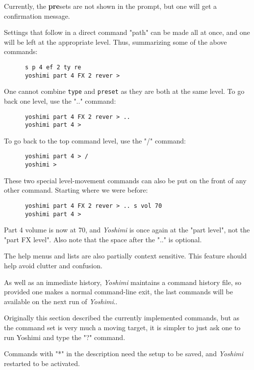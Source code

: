    Currently, the \textbf{pre}sets are not shown in the prompt, but one
   will get a confirmation message.

   Settings that follow in a direct command "path"
   can be made all at once, and one will be left at the appropriate level.
   Thus, summarizing some of the above commands:

   \begin{verbatim}
      s p 4 ef 2 ty re
      yoshimi part 4 FX 2 rever >
   \end{verbatim}

   One cannot combine \texttt{type} and \texttt{preset} as they
   are both at the same level.  To go back one level, use the
   ".." command:

   \begin{verbatim}
      yoshimi part 4 FX 2 rever > ..
      yoshimi part 4 >
   \end{verbatim}

   To go back to the top command level, use the "/" command:

   \begin{verbatim}
      yoshimi part 4 > /
      yoshimi >
   \end{verbatim}

   These two special level-movement commands can also be put on the front of
   any other command.  Starting where we were before:

   \begin{verbatim}
      yoshimi part 4 FX 2 rever > .. s vol 70
      yoshimi part 4 >
   \end{verbatim}

   Part 4 volume is now at 70, and \textsl{Yoshimi} is once again at the
   "part level", not the "part FX level".  Also note that the space after
   the ".." is optional.

   The help menus and lists are also partially context sensitive. This
   feature should help avoid clutter and confusion.

   As well as an immediate history, \textsl{Yoshimi} maintains a command
   history file, so provided one makes a normal command-line exit, the last
   commands will be available on the next run of \textsl{Yoshimi}..

   Originally this section described the currently implemented commands,
   but as the command set is very much a moving target, it is simpler to just
   ask one to run Yoshimi and type the "?" command.

   Commands with "*" in the description need the setup to be saved,
   and \textsl{Yoshimi} restarted to be activated. 

